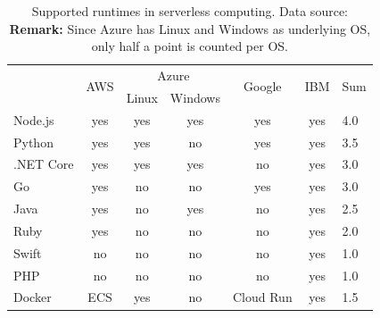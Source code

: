 \begin{table}[htp]
\centering
\captionsetup[table]{justification=centering, labelfont=bf}
\begin{tabular}{|l|c|c|c|c|c||l|} 
 \hline
 & \multirow{2}{*}{AWS} & \multicolumn{2}{c|}{Azure} & \multirow{2}{*}{Google} & \multirow{2}{*}{IBM} & \multirow{2}{*}{Sum} \\ \cline{3-4}
  & & Linux & Windows & & & \\ \hline
  Node.js &  \cellcolor{green!25}yes & \cellcolor{green!25}yes & \cellcolor{green!25}yes & \cellcolor{green!25}yes & \cellcolor{green!25}yes & 4.0 \\ \hline
  Python & \cellcolor{green!25}yes & \cellcolor{green!25}yes & \cellcolor{red!25}no & \cellcolor{green!25}yes & \cellcolor{green!25}yes & 3.5 \\ \hline
  .NET Core & \cellcolor{green!25}yes & \cellcolor{green!25}yes & \cellcolor{green!25}yes & \cellcolor{red!25}no & \cellcolor{green!25}yes & 3.0 \\ \hline
  Go & \cellcolor{green!25}yes & \cellcolor{red!25}no & \cellcolor{red!25}no & \cellcolor{green!25}yes & \cellcolor{green!25}yes & 3.0 \\ \hline
  Java & \cellcolor{green!25}yes & \cellcolor{red!25}no & \cellcolor{green!25}yes & \cellcolor{red!25}no & \cellcolor{green!25}yes & 2.5 \\ \hline
  Ruby & \cellcolor{green!25}yes & \cellcolor{red!25}no & \cellcolor{red!25}no & \cellcolor{red!25}no & \cellcolor{green!25}yes & 2.0 \\ \hline
  Swift & \cellcolor{red!25}no & \cellcolor{red!25}no & \cellcolor{red!25}no & \cellcolor{red!25}no & \cellcolor{green!25}yes & 1.0 \\ \hline
  PHP & \cellcolor{red!25}no & \cellcolor{red!25}no & \cellcolor{red!25}no & \cellcolor{red!25}no & \cellcolor{green!25}yes & 1.0 \\ \hline
  Docker & \cellcolor{yellow!25}ECS & \cellcolor{green!25}yes & \cellcolor{red!25}no & \cellcolor{yellow!25}Cloud Run & \cellcolor{green!25}yes & 1.5 \\
 \hline
\end{tabular}
\caption[Supported runtimes in serverless computing]{Supported runtimes in serverless computing.  Data source: \cite{AWSLambdaLanguages, AzureFunctionsLanguages, GoogleFunctionsLanguages, IBMRuntimes}\\ \textbf{Remark:} Since Azure has Linux and Windows as underlying \gls{OS}, only half a point is counted per \gls{OS}.}
\label{table:programming_languages}
\end{table}

